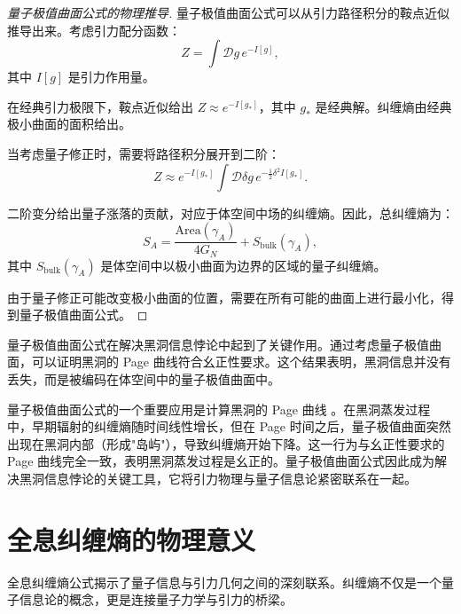 \begin{proof}[量子极值曲面公式的物理推导]
量子极值曲面公式可以从引力路径积分的鞍点近似推导出来。考虑引力配分函数：
\begin{equation}
    Z = \int \mathcal{D}g \, e^{-I[g]},
\end{equation}
其中 $I[g]$ 是引力作用量。

在经典引力极限下，鞍点近似给出 $Z \approx e^{-I[g_*]}$，其中 $g_*$ 是经典解。纠缠熵由经典极小曲面的面积给出。

当考虑量子修正时，需要将路径积分展开到二阶：
\begin{equation}
    Z \approx e^{-I[g_*]} \int \mathcal{D}\delta g \, e^{-\frac{1}{2} \delta^2 I[g_*]}.
\end{equation}

二阶变分给出量子涨落的贡献，对应于体空间中场的纠缠熵。因此，总纠缠熵为：
\begin{equation}
    S_A = \frac{\text{Area}(\gamma_A)}{4G_N} + S_{\text{bulk}}(\gamma_A),
\end{equation}
其中 $S_{\text{bulk}}(\gamma_A)$ 是体空间中以极小曲面为边界的区域的量子纠缠熵。

由于量子修正可能改变极小曲面的位置，需要在所有可能的曲面上进行最小化，得到量子极值曲面公式。
\end{proof}

\begin{remark}[量子极值曲面与黑洞信息]
量子极值曲面公式在解决黑洞信息悖论中起到了关键作用。通过考虑量子极值曲面，可以证明黑洞的 Page 曲线符合幺正性要求。这个结果表明，黑洞信息并没有丢失，而是被编码在体空间中的量子极值曲面中。
\end{remark}

\begin{remark}
量子极值曲面公式的一个重要应用是计算黑洞的 Page 曲线 \cite{Engelhardt2015}。在黑洞蒸发过程中，早期辐射的纠缠熵随时间线性增长，但在 Page 时间之后，量子极值曲面突然出现在黑洞内部（形成"岛屿"），导致纠缠熵开始下降。这一行为与幺正性要求的 Page 曲线完全一致，表明黑洞蒸发过程是幺正的。量子极值曲面公式因此成为解决黑洞信息悖论的关键工具，它将引力物理与量子信息论紧密联系在一起。
\end{remark}

\section{全息纠缠熵的物理意义}

全息纠缠熵公式揭示了量子信息与引力几何之间的深刻联系。纠缠熵不仅是一个量子信息论的概念，更是连接量子力学与引力的桥梁。

